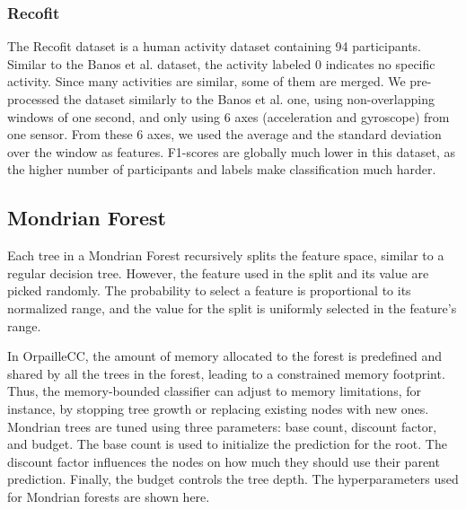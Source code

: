 \documentclass[conference]{IEEEtran}
\begin{document}
\subsubsection{Recofit}

The Recofit \cite{morris2014recofit} dataset is a human activity dataset
containing 94 participants. Similar to the Banos et al. dataset, the activity
labeled 0 indicates no specific activity. Since many activities are similar,
some of them are merged. We pre-processed the dataset similarly to the Banos et
al. one, using non-overlapping windows of one second, and only using 6 axes
(acceleration and gyroscope) from one sensor. From these 6 axes, we used the
average and the standard deviation over the window as features. F1-scores are
globally much lower in this dataset, as the higher number of participants and
labels make classification much harder.

\subsection{Mondrian Forest}

Each tree in a Mondrian Forest recursively splits the feature space, similar to
a regular decision tree. However, the feature used in the split and its value
are picked randomly. The probability to select a feature is proportional to its
normalized range, and the value for the split is uniformly selected in the
feature's range. \par In OrpailleCC, the amount of memory allocated to the
forest is predefined and shared by all the trees in the forest, leading to a
constrained memory footprint. Thus, the memory-bounded classifier can adjust to
memory limitations, for instance, by stopping tree growth or replacing existing
nodes with new ones. Mondrian trees are tuned using three parameters: base
count, discount factor, and budget. The base count is used to initialize the
prediction for the root. The discount factor influences the nodes on how much
they should use their parent prediction. \cite{khannouz2020benchmark} Finally,
the budget controls the tree depth. The hyperparameters used for Mondrian
forests are shown here.
\end{document}
